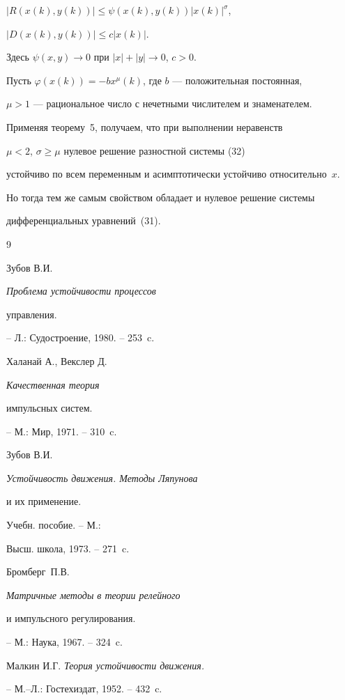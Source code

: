 \begin{exam}
$|R(x(k),y(k))|\leq \psi(x(k),y(k))|x(k)|^\sigma$,


$|D(x(k),y(k))|\leq c |x(k)|$.


Здесь $\psi(x,y) \to 0$ при $|x|+|y| \to 0$, $c>0$.





Пусть $\varphi(x(k))=-b x^\mu(k)$, где $b$ --- положительная постоянная,


$\mu>1$ --- рациональное число с нечетными числителем и знаменателем.


Применяя теорему~5, получаем, что при выполнении неравенств


$\mu<2$, $\sigma\geq \mu$ нулевое решение разностной системы (32)


устойчиво по всем переменным и асимптотически устойчиво относительно~$x$.


Но тогда тем же самым свойством обладает и нулевое решение системы


дифференциальных уравнений~(31).


\end{exam}








\begin{thebibliography}{9}










Зубов В.И. {\it Проблема устойчивости процессов


управления.} -- Л.: Судостроение, 1980. -- 253~c.




Халанай А., Векслер Д. {\it Качественная теория


импульсных систем.} -- М.: Мир, 1971. -- 310~c.




Зубов В.И. {\it Устойчивость движения. Методы Ляпунова


и их применение.} Учебн. пособие. -- М.:


Высш. школа, 1973. -- 271~c.




Бромберг~П.В. {\it Матричные методы в теории релейного


и импульсного регулирования.} -- М.: Наука, 1967. -- 324~c.




Малкин И.Г. {\it Теория устойчивости движения.}


-- М.--Л.: Гостехиздат, 1952. -- 432~c.





\end{thebibliography}





\vskip 2cm












\label{end}





